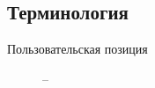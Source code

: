 \subsection{Терминология}
\begin{description}
  \item[Пользовательская позиция] -- 

\end{description}

